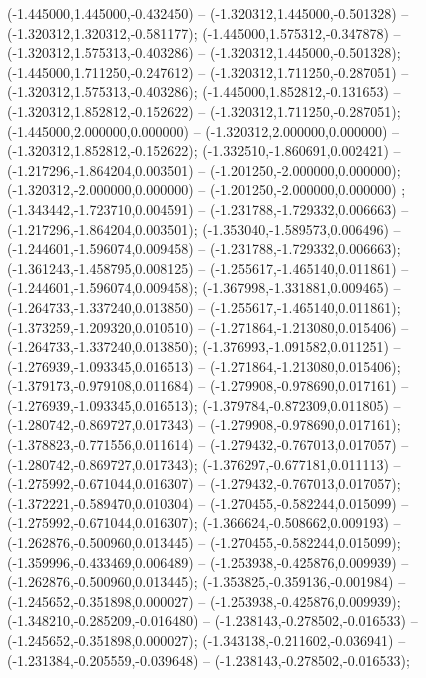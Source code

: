  (-1.445000,1.445000,-0.432450) -- (-1.320312,1.445000,-0.501328) -- (-1.320312,1.320312,-0.581177);
 (-1.445000,1.575312,-0.347878) -- (-1.320312,1.575313,-0.403286) -- (-1.320312,1.445000,-0.501328);
 (-1.445000,1.711250,-0.247612) -- (-1.320312,1.711250,-0.287051) -- (-1.320312,1.575313,-0.403286);
 (-1.445000,1.852812,-0.131653) -- (-1.320312,1.852812,-0.152622) -- (-1.320312,1.711250,-0.287051);
 (-1.445000,2.000000,0.000000) -- (-1.320312,2.000000,0.000000) -- (-1.320312,1.852812,-0.152622);
 (-1.332510,-1.860691,0.002421) -- (-1.217296,-1.864204,0.003501) -- (-1.201250,-2.000000,0.000000);
 (-1.320312,-2.000000,0.000000) -- (-1.201250,-2.000000,0.000000) ;
 (-1.343442,-1.723710,0.004591) -- (-1.231788,-1.729332,0.006663) -- (-1.217296,-1.864204,0.003501);
 (-1.353040,-1.589573,0.006496) -- (-1.244601,-1.596074,0.009458) -- (-1.231788,-1.729332,0.006663);
 (-1.361243,-1.458795,0.008125) -- (-1.255617,-1.465140,0.011861) -- (-1.244601,-1.596074,0.009458);
 (-1.367998,-1.331881,0.009465) -- (-1.264733,-1.337240,0.013850) -- (-1.255617,-1.465140,0.011861);
 (-1.373259,-1.209320,0.010510) -- (-1.271864,-1.213080,0.015406) -- (-1.264733,-1.337240,0.013850);
 (-1.376993,-1.091582,0.011251) -- (-1.276939,-1.093345,0.016513) -- (-1.271864,-1.213080,0.015406);
 (-1.379173,-0.979108,0.011684) -- (-1.279908,-0.978690,0.017161) -- (-1.276939,-1.093345,0.016513);
 (-1.379784,-0.872309,0.011805) -- (-1.280742,-0.869727,0.017343) -- (-1.279908,-0.978690,0.017161);
 (-1.378823,-0.771556,0.011614) -- (-1.279432,-0.767013,0.017057) -- (-1.280742,-0.869727,0.017343);
 (-1.376297,-0.677181,0.011113) -- (-1.275992,-0.671044,0.016307) -- (-1.279432,-0.767013,0.017057);
 (-1.372221,-0.589470,0.010304) -- (-1.270455,-0.582244,0.015099) -- (-1.275992,-0.671044,0.016307);
 (-1.366624,-0.508662,0.009193) -- (-1.262876,-0.500960,0.013445) -- (-1.270455,-0.582244,0.015099);
 (-1.359996,-0.433469,0.006489) -- (-1.253938,-0.425876,0.009939) -- (-1.262876,-0.500960,0.013445);
 (-1.353825,-0.359136,-0.001984) -- (-1.245652,-0.351898,0.000027) -- (-1.253938,-0.425876,0.009939);
 (-1.348210,-0.285209,-0.016480) -- (-1.238143,-0.278502,-0.016533) -- (-1.245652,-0.351898,0.000027);
 (-1.343138,-0.211602,-0.036941) -- (-1.231384,-0.205559,-0.039648) -- (-1.238143,-0.278502,-0.016533);

